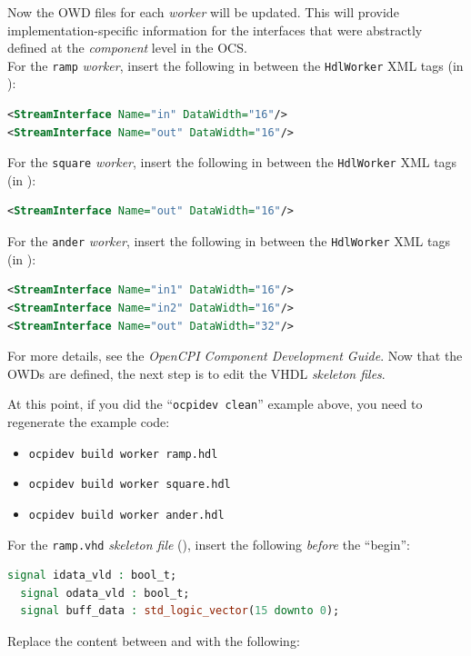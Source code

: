 Now the OWD files for each \textit{worker} will be updated. This will provide implementation-specific information for the interfaces that were abstractly defined at the \textit{component} level in the OCS.\\
\bstart
For the \verb+ramp+ \textit{worker}, insert the following in between the \verb+HdlWorker+ XML tags (in ):

\begin{lstlisting}[language=xml]
<StreamInterface Name="in" DataWidth="16"/>
<StreamInterface Name="out" DataWidth="16"/>
\end{lstlisting}
\bend
\bstart
For the \verb+square+ \textit{worker}, insert the following in between the \verb+HdlWorker+ XML tags (in ):

\begin{lstlisting}[language=xml]
<StreamInterface Name="out" DataWidth="16"/>
\end{lstlisting}
\bend
\bstart
For the \verb+ander+ \textit{worker}, insert the following in between the \verb+HdlWorker+ XML tags (in ):

\begin{lstlisting}[language=xml]
<StreamInterface Name="in1" DataWidth="16"/>
<StreamInterface Name="in2" DataWidth="16"/>
<StreamInterface Name="out" DataWidth="32"/>
\end{lstlisting}
\bend

For more details, see the \textit{OpenCPI Component Development Guide}. Now that the OWDs are defined, the next step is to edit the VHDL \textit{skeleton files}.

\bstart
At this point, if you did the ``\texttt{ocpidev clean}'' example above, you need to regenerate the example code:
\begin{itemize}
\setlength\itemsep{0pt}
\item \texttt{ocpidev build worker ramp.hdl}
\item \texttt{ocpidev build worker square.hdl}
\item \texttt{ocpidev build worker ander.hdl}
\end{itemize}
\bend
\bstart
For the \verb+ramp.vhd+ \textit{skeleton file} (), insert the following \textit{before} the ``begin'':
\begin{lstlisting}[language=vhdl, columns=fullflexible, breaklines=true, prebreak=\textbackslash, basicstyle=\ttfamily, showstringspaces=false, upquote=true]
  signal idata_vld : bool_t;
  signal odata_vld : bool_t;
  signal buff_data : std_logic_vector(15 downto 0);
\end{lstlisting}
\bend
\pagebreak[1]
Replace the content between  and  with the following:

